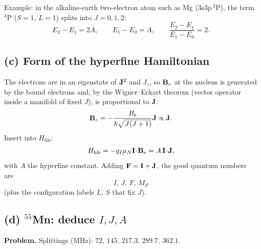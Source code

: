 \documentclass[11pt]{article}
\begin{document}
Example: in the alkaline-earth two-electron atom such as Mg ($3\mathrm{s}3\mathrm{p}\,{}^{3}\!\mathrm{P}$), the term $^{3}\!\mathrm{P}$ ($S=1$, $L=1$) splits into $J=0,1,2$:
\[
E_{2}-E_{1}=2A,\qquad E_{1}-E_{0}=A,\qquad \frac{E_{2}-E_{1}}{E_{1}-E_{0}}=2.
\]
\begin{center}
\end{center}

\subsection*{(c) Form of the hyperfine Hamiltonian}

The electrons are in an eigenstate of $\vb J^{2}$ and $J_{z}$, so $\vb B_{e}$ at the nucleus is generated by the bound electrons and, by the Wigner--Eckart theorem (vector operator inside a manifold of fixed $J$), is proportional to $\vb J$:
\[
\vb B_{e}=-\frac{B_{e}}{\hbar\sqrt{J(J+1)}}\vb J\propto \vb J.
\]
Insert into $H_{\mathrm{hfs}}$:
\[
H_{\mathrm{hfs}}=-g_{I}\mu_{N}\vb I\!\cdot\!\vb B_{e}=A\,\vb I\!\cdot\!\vb J,
\]
with $A$ the hyperfine constant. Adding $\vb F=\vb I+\vb J$, the good quantum numbers are
\[
\boxed{\;I,\,J,\,F,\,M_{F}\;}
\]
(plus the configuration labels $L$, $S$ that fix $J$).

\subsection*{(d) \texorpdfstring{$^{55}$Mn}{55Mn}: deduce \texorpdfstring{$I,J,A$}{I,J,A}}

\textbf{Problem.} Splittings (MHz): $72,\,145,\,217.3,\,289.7,\,362.1$.
\end{document}
